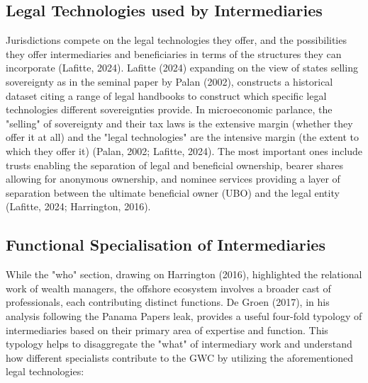 \subsection{Legal Technologies used by Intermediaries}

Jurisdictions compete on the legal technologies they offer, and the possibilities they offer intermediaries and beneficiaries in terms of the structures they can incorporate (Lafitte, 2024). Lafitte (2024) expanding on the view of states selling sovereignty as in the seminal paper by Palan (2002), constructs a historical dataset citing a range of legal handbooks to construct which specific legal technologies different sovereignties provide. In microeconomic parlance, the "selling" of sovereignty and their tax laws is the extensive margin (whether they offer it at all) and the "legal technologies" are the intensive margin (the extent to which they offer it) (Palan, 2002; Lafitte, 2024). The most important ones include trusts enabling the separation of legal and beneficial ownership, bearer shares allowing for anonymous ownership, and nominee services providing a layer of separation between the ultimate beneficial owner (UBO) and the legal entity (Lafitte, 2024; Harrington, 2016). 

\subsection{Functional Specialisation of Intermediaries}

While the "who" section, drawing on Harrington (2016), highlighted the relational work of wealth managers, the offshore ecosystem involves a broader cast of professionals, each contributing distinct functions. De Groen (2017), in his analysis following the Panama Papers leak, provides a useful four-fold typology of intermediaries based on their primary area of expertise and function. This typology helps to disaggregate the "what" of intermediary work and understand how different specialists contribute to the GWC by utilizing the aforementioned legal technologies:

